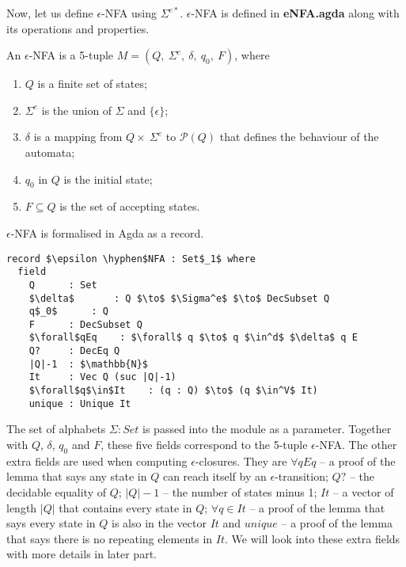\par Now, let us define \(\epsilon\)-NFA using \(\Sigma^{e*}\). \(\epsilon\)-NFA is
defined in \textbf{eNFA.agda} along with its operations and
properties. 

\begin{defn}
\noindent An \(\epsilon\)-NFA is a 5-tuple \(M = (Q
,\ \Sigma^e,\ \delta,\ q_0,\ F)\), where
\begin{enumerate}[nolistsep]
  \item \(Q\) is a finite set of states;
  \item \(\Sigma^e\) is the union of \(\Sigma\) and \(\{\epsilon\}\);
  \item \(\delta\) is a mapping from \(Q \times\ \Sigma^e\) to
    \(\mathcal P \left({Q}\right)\) that defines the behaviour of the automata;
  \item \(q_0\) in \(Q\) is the initial state;
  \item \(F \subseteq Q\) is the set of accepting states. 
\end{enumerate}
\end{defn}

\par \(\epsilon\)-NFA is formalised in Agda as a record. 

\begin{lstlisting}[mathescape=true,xleftmargin=.3\textwidth]
record $\epsilon \hyphen$NFA : Set$_1$ where
  field
    Q      : Set
    $\delta$       : Q $\to$ $\Sigma^e$ $\to$ DecSubset Q
    q$_0$      : Q
    F      : DecSubset Q
    $\forall$qEq    : $\forall$ q $\to$ q $\in^d$ $\delta$ q E
    Q?     : DecEq Q
    |Q|-1  : $\mathbb{N}$
    It     : Vec Q (suc |Q|-1)
    $\forall$q$\in$It    : (q : Q) $\to$ (q $\in^V$ It)
    unique : Unique It
\end{lstlisting}

\par The set of alphabets \(\Sigma : Set\) is passed into the module as a
parameter. Together with \(Q\), \(\delta\),
\(q_0\) and \(F\), these five fields correspond to the 5-tuple
\(\epsilon\)-NFA. The other extra fields are used when computing
\(\epsilon\)-closures. They are \(\forall qEq\) -- a proof of the
lemma that says any state in \(Q\) can reach itself by an
\(\epsilon\)-transition; \(Q?\) -- the decidable equality of \(Q\);
\(|Q|-1\) -- the number of states minus 1; \(It\) -- a vector of
length \(|Q|\) that contains every state in \(Q\); \(\forall q\in It\)
-- a proof of the lemma that says every state in \(Q\) is also in the vector
\(It\) and \(unique\) -- a proof of the lemma that says there is no repeating elements in
\(It\). We will look into these extra fields with more details in
later part. 

